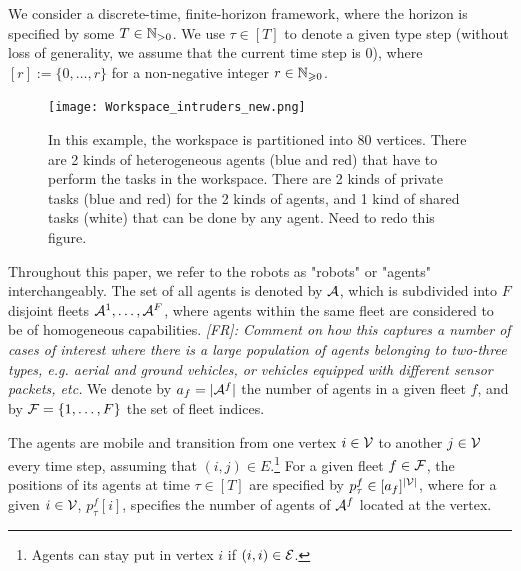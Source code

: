 \documentclass[conference]{IEEEtran}
\newcommand{\frline}[2]{{\color{blue}#1}{\em \color{blue}[FR]: #2}}
\newcommand{\todo}[1]{{\color{red}{\bf TODO:} #1}}
\newcommand{\frline}[2]{#1}
\newcommand{\todo}[1]{}
\begin{document}
We consider a discrete-time, finite-horizon framework, where the horizon is specified by some $T\in \mathbb{N}_{>0}$. We use $\tau\in [T]$ to denote a given type step (without loss of generality, we assume that the current time step is $0$), where $[r]:=\{0,\ldots,r\}$ for a non-negative integer $r\in \mathbb{N}_{\geqslant 0}$.


\begin{figure}[!ht]
    \centering
    \texttt{[image: Workspace\_intruders\_new.png]}
    \caption{In this example, the workspace is partitioned into $80$ vertices. There are 2 kinds of heterogeneous agents (blue and red) that have to perform the tasks in the workspace. There are 2 kinds of private tasks (blue and red) for the 2 kinds of agents, and 1 kind of shared tasks (white) that can be done by any agent. \todo{Need to redo this figure.}}
    \label{fig:workspace}
\end{figure}

Throughout this paper, we refer to the robots as "robots" or "agents" interchangeably. The set of all agents is denoted by $\mathcal{A}$, which is subdivided into $F$ disjoint fleets $\mathcal{A}^1,\ldots, \mathcal{A}^F$, where agents within the same fleet are considered to be of homogeneous capabilities.  
\frline{}{Comment on how this captures a number of cases of interest where there is a large population of agents belonging to two-three types, e.g. aerial and ground vehicles, or vehicles equipped with different sensor packets, etc.}
We denote by $a_f=|\mathcal{A}^f|$ the number of agents in a given fleet $f$, and by $\mathcal{F}=\{1,\ldots,F\}$ the set of fleet indices. 

The agents are mobile and transition from one vertex $i\in \mathcal{V}$ to another $j\in \mathcal{V}$ every time step, assuming that $(i,j)\in E$.\footnote{Agents can stay put in vertex $i$ if $(i,i)\in \mathcal{E}$.}
For a given fleet $f\in \mathcal{F}$, the positions of its agents at time $\tau\in [T]$ are specified by $p^f_\tau\in [a_f]^{ |\mathcal{V}|}$, where for a given $i\in \mathcal{V}$, $p^f_\tau[i]$, specifies the number of agents of $\mathcal{A}^f$ located at the vertex. %
\end{document}
